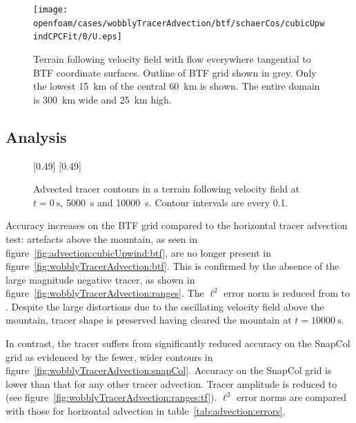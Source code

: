 \begin{figure}
	\centering
	\texttt{[image: openfoam/cases/wobblyTracerAdvection/btf/schaerCos/cubicUpwindCPCFit/0/U.eps]}
%
	\caption{Terrain following velocity field with flow everywhere tangential to BTF coordinate surfaces.  Outline of BTF grid shown in grey.  Only the lowest \SI{15}{\kilo\meter} of the central \SI{60}{\kilo\meter} is shown.  The entire domain is \SI{300}{\kilo\meter} wide and \SI{25}{\kilo\meter} high.}
	\label{fig:wobblyTracer:u}
\end{figure}

\subsection{Analysis}

\begin{figure}
	\captionsetup[subfigure]{position=b}
	\centering
	[0.49\textwidth]{}
	\hfill
	[0.49\textwidth]{}
%
	\caption{Advected tracer contours in a terrain following velocity field at $t = \SI{0}{\second}$, \SI{5000}{\second} and \SI{10000}{\second}.  Contour intervals are every 0.1.}
\end{figure}

Accuracy increases on the BTF grid compared to the horizontal tracer advection test: artefacts above the mountain, as seen in figure~\ref{fig:advection:cubicUpwind:btf}, are no longer present in figure~\ref{fig:wobblyTracerAdvection:btf}.  This is confirmed by the absence of the large magnitude negative tracer, as shown in figure~\ref{fig:wobblyTracerAdvection:ranges}.  The $\ell^2$ error norm is reduced from  to \unskip.  Despite the large distortions due to the oscillating velocity field above the mountain, tracer shape is preserved having cleared the mountain at $t = \SI{10000}{\second}$.

In contrast, the tracer suffers from significantly reduced accuracy on the SnapCol grid as evidenced by the fewer, wider contours in figure~\ref{fig:wobblyTracerAdvection:snapCol}.  Accuracy on the SnapCol grid is lower than that for any other tracer advection.  Tracer amplitude is reduced to  (see figure~\ref{fig:wobblyTracerAdvection:ranges:tf}).  $\ell^2$ error norms are compared with those for horizontal advection in table~\ref{tab:advection:errors}.


